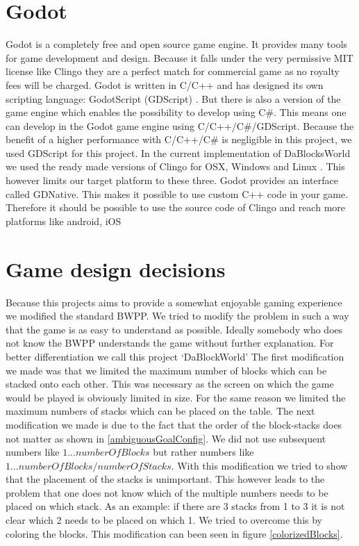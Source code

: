 \documentclass[runningheads]{llncs}
\begin{document}
    \section{Godot}
        Godot is a completely free and open source game engine.
        It provides many tools for game development and design.
        Because it falls under the very permissive MIT license like Clingo 
        they are a perfect match for commercial game as no royalty fees will be charged.
        Godot is written in C/C++ and has designed its own scripting language: GodotScript (GDScript) \cite{godotWebsite}.
        But there is also a version of the game engine which enables the possibility to develop using C\#.
        This means one can develop in the Godot game engine using C/C++/C\#/GDScript.
        Because the benefit of a higher performance with C/C++/C\# \cite{godotPerformanceComparison} is negligible in this project,
        we used GDScript for this project.\newline
        In the current implementation of DaBlocksWorld we used the ready made versions of Clingo for OSX, Windows and Linux \cite{clingoGithub}.
        This however limits our target platform to these three.
        Godot provides an interface called GDNative.
        This makes it possible to use custom C++ code in your game.
        Therefore it should be possible to use the source code of Clingo \cite{clingoGithub} and reach more platforms like android, iOS  
        
    \section{Game design decisions}
        Because this projects aims to provide a somewhat enjoyable gaming experience we modified the standard BWPP.
        We tried to modify the problem in such a way that the game is as easy to understand as possible.
        Ideally somebody who does not know the BWPP understands the game without further explanation.
        For better differentiation we call this project `DaBlockWorld'\newline
        The first modification we made was that we limited the maximum number of blocks which can be stacked onto each other.
        This was necessary as the screen on which the game would be played is obviously limited in size.
        For the same reason we limited the maximum numbers of stacks which can be placed on the table.\newline
        The next modification we made is due to the fact that the order of the block-stacks does not matter as shown in \ref{ambiguousGoalConfig}.
        We did not use subsequent numbers like $1 ... numberOfBlocks$ but rather numbers like $1 ... numberOfBlocks / numberOfStacks$.
        With this modification we tried to show that the placement of the stacks is unimportant.
        This however leads to the problem that one does not know which of the multiple numbers needs to be placed on which stack.
        As an example: if there are 3 stacks from 1 to 3 it is not clear which 2 needs to be placed on which 1.
        We tried to overcome this by coloring the blocks.
        This modification can been seen in figure \ref{colorizedBlocks}. \newline
        
\end{document}

